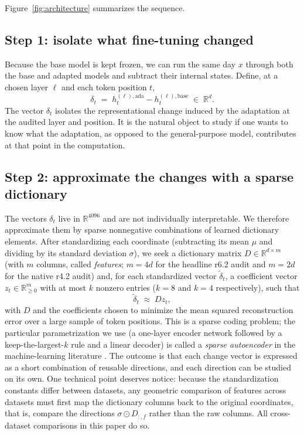 \documentclass[10pt]{article} %
\begin{document}
Figure~\ref{fig:architecture} summarizes the sequence.



\subsection{Step 1: isolate what fine-tuning changed}

Because the base model is kept frozen, we can run the same day $x$
through both the base and adapted models and subtract their internal
states. Define, at a chosen layer $\ell$ and each token position $t$,
\begin{equation}
\delta_t \;=\; h^{(\ell), \mathrm{ada}}_t - h^{(\ell),
\mathrm{base}}_t \;\in\; \mathbb{R}^{d}.
\end{equation}
The vector $\delta_t$ isolates the representational change induced by
the adaptation at the audited layer and position. It is the natural
object to study if one wants to know what the adaptation, as opposed to
the general-purpose model, contributes at that point in the
computation.

\subsection{Step 2: approximate the changes with a sparse dictionary}

The vectors $\delta_t$ live in $\mathbb{R}^{4096}$ and are not
individually interpretable. We therefore approximate them by sparse
nonnegative combinations of learned dictionary elements. After
standardizing each coordinate (subtracting its mean $\mu$ and dividing
by its standard deviation $\sigma$), we seek a dictionary matrix
$D \in \mathbb{R}^{d \times m}$ (with $m$ columns, called \emph{features};
$m = 4d$ for the headline r6.2 audit and $m = 2d$ for the native r4.2 audit) and, for each standardized vector
$\tilde\delta_t$, a coefficient vector
$z_t \in \mathbb{R}^{m}_{\geq 0}$ with at most $k$ nonzero entries ($k = 8$
and $k = 4$ respectively), such that
\begin{equation}
\tilde\delta_t \;\approx\; D z_t ,
\end{equation}
with $D$ and the coefficients chosen to minimize the mean squared
reconstruction error over a large sample of token positions. This is a
sparse coding problem; the particular parametrization we use (a
one-layer encoder network followed by a keep-the-largest-$k$ rule and a
linear decoder) is called a \emph{sparse autoencoder} in the
machine-learning literature \citep{cunningham2023sparse,gao2024scaling}. The outcome is that each change vector is
expressed as a short combination of reusable directions, and each
direction can be studied on its own. One technical point deserves
notice: because the standardization constants differ between datasets,
any geometric comparison of features across datasets must first map the
dictionary columns back to the original coordinates, that is, compare
the directions $\sigma \odot D_{:,f}$ rather than the raw columns. All
cross-dataset comparisons in this paper do so.
\end{document}
